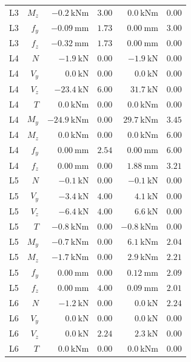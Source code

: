 \documentclass[11pt,a4paper]{article}
\begin{document}
\begin{longtable}{rrrrrr}
L3 & $M_z$ & $-0.2\ \mathrm{kNm}$ & $3.00$ & $0.0\ \mathrm{kNm}$ & $0.00$ \\
L3 & $f_y$ & $-0.09\ \mathrm{mm}$ & $1.73$ & $0.00\ \mathrm{mm}$ & $3.00$ \\
L3 & $f_z$ & $-0.32\ \mathrm{mm}$ & $1.73$ & $0.00\ \mathrm{mm}$ & $0.00$ \\
L4 & $N$ & $-1.9\ \mathrm{kN}$ & $0.00$ & $-1.9\ \mathrm{kN}$ & $0.00$ \\
L4 & $V_y$ & $0.0\ \mathrm{kN}$ & $0.00$ & $0.0\ \mathrm{kN}$ & $0.00$ \\
L4 & $V_z$ & $-23.4\ \mathrm{kN}$ & $6.00$ & $31.7\ \mathrm{kN}$ & $0.00$ \\
L4 & $T$ & $0.0\ \mathrm{kNm}$ & $0.00$ & $0.0\ \mathrm{kNm}$ & $0.00$ \\
L4 & $M_y$ & $-24.9\ \mathrm{kNm}$ & $0.00$ & $29.7\ \mathrm{kNm}$ & $3.45$ \\
L4 & $M_z$ & $0.0\ \mathrm{kNm}$ & $0.00$ & $0.0\ \mathrm{kNm}$ & $6.00$ \\
L4 & $f_y$ & $0.00\ \mathrm{mm}$ & $2.54$ & $0.00\ \mathrm{mm}$ & $6.00$ \\
L4 & $f_z$ & $0.00\ \mathrm{mm}$ & $0.00$ & $1.88\ \mathrm{mm}$ & $3.21$ \\
L5 & $N$ & $-0.1\ \mathrm{kN}$ & $0.00$ & $-0.1\ \mathrm{kN}$ & $0.00$ \\
L5 & $V_y$ & $-3.4\ \mathrm{kN}$ & $4.00$ & $4.1\ \mathrm{kN}$ & $0.00$ \\
L5 & $V_z$ & $-6.4\ \mathrm{kN}$ & $4.00$ & $6.6\ \mathrm{kN}$ & $0.00$ \\
L5 & $T$ & $-0.8\ \mathrm{kNm}$ & $0.00$ & $-0.8\ \mathrm{kNm}$ & $0.00$ \\
L5 & $M_y$ & $-0.7\ \mathrm{kNm}$ & $0.00$ & $6.1\ \mathrm{kNm}$ & $2.04$ \\
L5 & $M_z$ & $-1.7\ \mathrm{kNm}$ & $0.00$ & $2.9\ \mathrm{kNm}$ & $2.21$ \\
L5 & $f_y$ & $0.00\ \mathrm{mm}$ & $0.00$ & $0.12\ \mathrm{mm}$ & $2.09$ \\
L5 & $f_z$ & $0.00\ \mathrm{mm}$ & $4.00$ & $0.09\ \mathrm{mm}$ & $2.01$ \\
L6 & $N$ & $-1.2\ \mathrm{kN}$ & $0.00$ & $0.0\ \mathrm{kN}$ & $2.24$ \\
L6 & $V_y$ & $0.0\ \mathrm{kN}$ & $0.00$ & $0.0\ \mathrm{kN}$ & $0.00$ \\
L6 & $V_z$ & $0.0\ \mathrm{kN}$ & $2.24$ & $2.3\ \mathrm{kN}$ & $0.00$ \\
L6 & $T$ & $0.0\ \mathrm{kNm}$ & $0.00$ & $0.0\ \mathrm{kNm}$ & $0.00$ \\

\end{longtable}
\end{document}
